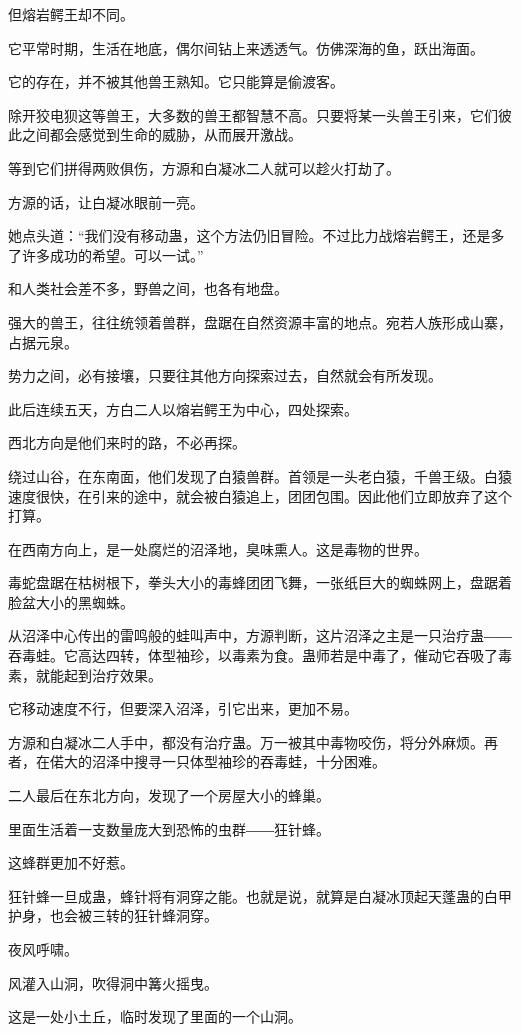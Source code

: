 \begin{this_body}
但熔岩鳄王却不同。

它平常时期，生活在地底，偶尔间钻上来透透气。仿佛深海的鱼，跃出海面。

它的存在，并不被其他兽王熟知。它只能算是偷渡客。

除开狡电狈这等兽王，大多数的兽王都智慧不高。只要将某一头兽王引来，它们彼此之间都会感觉到生命的威胁，从而展开激战。

等到它们拼得两败俱伤，方源和白凝冰二人就可以趁火打劫了。

方源的话，让白凝冰眼前一亮。

她点头道：“我们没有移动蛊，这个方法仍旧冒险。不过比力战熔岩鳄王，还是多了许多成功的希望。可以一试。”

和人类社会差不多，野兽之间，也各有地盘。

强大的兽王，往往统领着兽群，盘踞在自然资源丰富的地点。宛若人族形成山寨，占据元泉。

势力之间，必有接壤，只要往其他方向探索过去，自然就会有所发现。

此后连续五天，方白二人以熔岩鳄王为中心，四处探索。

西北方向是他们来时的路，不必再探。

绕过山谷，在东南面，他们发现了白猿兽群。首领是一头老白猿，千兽王级。白猿速度很快，在引来的途中，就会被白猿追上，团团包围。因此他们立即放弃了这个打算。

在西南方向上，是一处腐烂的沼泽地，臭味熏人。这是毒物的世界。

毒蛇盘踞在枯树根下，拳头大小的毒蜂团团飞舞，一张纸巨大的蜘蛛网上，盘踞着脸盆大小的黑蜘蛛。

从沼泽中心传出的雷鸣般的蛙叫声中，方源判断，这片沼泽之主是一只治疗蛊――吞毒蛙。它高达四转，体型袖珍，以毒素为食。蛊师若是中毒了，催动它吞吸了毒素，就能起到治疗效果。

它移动速度不行，但要深入沼泽，引它出来，更加不易。

方源和白凝冰二人手中，都没有治疗蛊。万一被其中毒物咬伤，将分外麻烦。再者，在偌大的沼泽中搜寻一只体型袖珍的吞毒蛙，十分困难。

二人最后在东北方向，发现了一个房屋大小的蜂巢。

里面生活着一支数量庞大到恐怖的虫群――狂针蜂。

这蜂群更加不好惹。

狂针蜂一旦成蛊，蜂针将有洞穿之能。也就是说，就算是白凝冰顶起天蓬蛊的白甲护身，也会被三转的狂针蜂洞穿。

夜风呼啸。

风灌入山洞，吹得洞中篝火摇曳。

这是一处小土丘，临时发现了里面的一个山洞。


\end{this_body}
